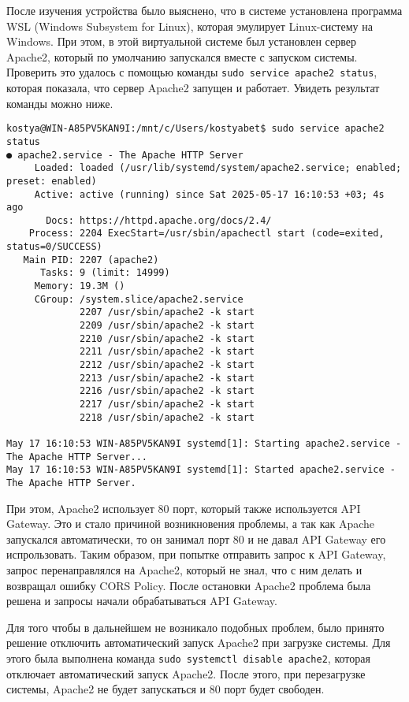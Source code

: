 После изучения устройства было выяснено, что в системе установлена программа WSL \cite{wslDocs} (Windows Subsystem for Linux), которая эмулирует
Linux-систему на Windows. При этом, в этой виртуальной системе был установлен сервер Apache2, который по умолчанию запускался
вместе с запуском системы. Проверить это удалось с помощью команды \texttt{sudo service apache2 status}, которая показала, что сервер
Apache2 запущен и работает. Увидеть результат команды можно ниже.

\begin{lstlisting}[style=CodeListing]
kostya@WIN-A85PV5KAN9I:/mnt/c/Users/kostyabet$ sudo service apache2 status
● apache2.service - The Apache HTTP Server
     Loaded: loaded (/usr/lib/systemd/system/apache2.service; enabled; preset: enabled)
     Active: active (running) since Sat 2025-05-17 16:10:53 +03; 4s ago
       Docs: https://httpd.apache.org/docs/2.4/
    Process: 2204 ExecStart=/usr/sbin/apachectl start (code=exited, status=0/SUCCESS)
   Main PID: 2207 (apache2)
      Tasks: 9 (limit: 14999)
     Memory: 19.3M ()
     CGroup: /system.slice/apache2.service
             2207 /usr/sbin/apache2 -k start
             2209 /usr/sbin/apache2 -k start
             2210 /usr/sbin/apache2 -k start
             2211 /usr/sbin/apache2 -k start
             2212 /usr/sbin/apache2 -k start
             2213 /usr/sbin/apache2 -k start
             2216 /usr/sbin/apache2 -k start
             2217 /usr/sbin/apache2 -k start
             2218 /usr/sbin/apache2 -k start

May 17 16:10:53 WIN-A85PV5KAN9I systemd[1]: Starting apache2.service - The Apache HTTP Server...
May 17 16:10:53 WIN-A85PV5KAN9I systemd[1]: Started apache2.service - The Apache HTTP Server.
\end{lstlisting}

При этом, Apache2 использует 80 порт, который также используется API Gateway. Это и стало причиной возникновения проблемы, а так как
Apache запускался автоматически, то он занимал порт 80 и не давал API Gateway его испрользовать. Таким образом, при попытке отправить запрос
к API Gateway, запрос перенаправлялся на Apache2, который не знал, что с ним делать и возвращал ошибку CORS Policy.
После остановки Apache2 проблема была решена и запросы начали обрабатываться API Gateway.

Для того чтобы в дальнейшем не возникало подобных проблем, было принято решение отключить автоматический запуск Apache2 при загрузке
системы. Для этого была выполнена команда \texttt{sudo systemctl disable apache2}, которая отключает автоматический запуск Apache2.
После этого, при перезагрузке системы, Apache2 не будет запускаться и 80 порт будет свободен.